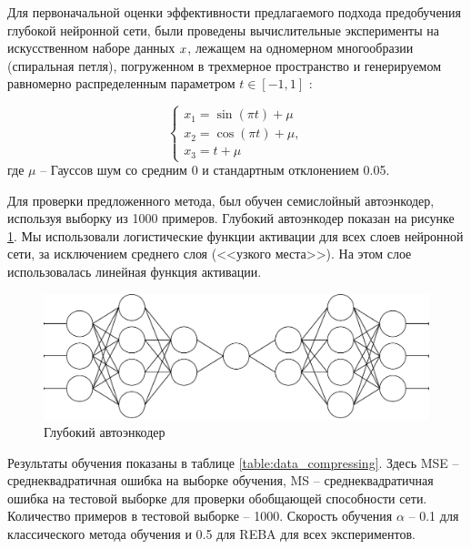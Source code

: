Для первоначальной оценки эффективности предлагаемого подхода предобучения глубокой нейронной сети, были проведены вычислительные эксперименты на искусственном наборе данных $\boldmath{x}$, лежащем на одномерном многообразии (спиральная петля), погруженном в трехмерное пространство \cite{n11} и генерируемом равномерно распределенным параметром $t \in [-1, 1]$ \cite[с.~14-15]{5-A}:

\begin{equation*}
	\begin{cases}
		x_1=\sin(\pi t) + \mu\\
		x_2=\cos(\pi t) + \mu,\\
		x_3=t + \mu
	\end{cases}
\end{equation*}
где $\mu$ -- Гауссов шум со средним 0 и стандартным отклонением 0.05.

Для проверки предложенного метода, был обучен семислойный автоэнкодер, используя выборку из 1000 примеров. Глубокий автоэнкодер показан на рисунке \ref{fig:autoencoder}. Мы использовали логистические функции активации для всех слоев нейронной сети, за исключением среднего слоя (<<узкого места>>). На этом слое использовалась линейная функция активации.

\begin{figure}[ht]
	\centering
	\includegraphics[width=16cm]{man-source/images/ch3/pic3-5.pdf}
	\caption{Глубокий автоэнкодер}
	\label{fig:autoencoder}
\end{figure}

Результаты обучения показаны в таблице \ref{table:data_compressing}. Здесь MSE -- среднеквадратичная ошибка на выборке обучения, MS -- среднеквадратичная ошибка на тестовой выборке для проверки обобщающей способности сети. Количество примеров в тестовой выборке -- 1000. Скорость обучения $\alpha$ -- 0.1 для классического метода обучения и 0.5 для REBA для всех экспериментов.

